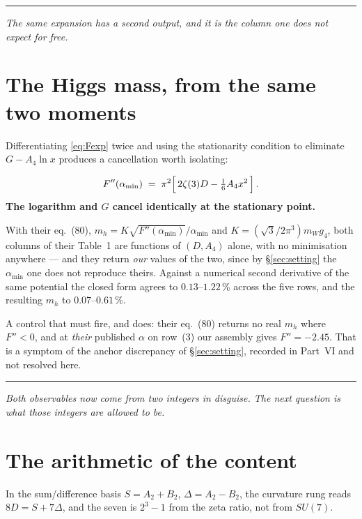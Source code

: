 \documentclass[11pt,a4paper]{article}
\newcommand{\su}[1]{SU(#1)}
\newcommand{\amin}{\alpha_{\min}}
\newcommand{\bridge}[1]{\par\medskip\noindent
  \textcolor{hdrblue!45}{\rule{2.2cm}{0.6pt}}\;\;\parbox[t]{0.84\textwidth}{\small\itshape
  \textcolor{hdrblue!85}{#1}}\par\medskip}
\newenvironment{keyeq}
  {\begin{center}\setlength{\fboxsep}{9pt}\setlength{\fboxrule}{0.8pt}%
   \begin{lrbox}{\keyeqbox}\begin{minipage}{0.88\textwidth}}
  {\end{minipage}\end{lrbox}%
   \fcolorbox{hdrblue!55}{hdrblue!6}{\usebox{\keyeqbox}}\end{center}}
\begin{document}
\bridge{The same expansion has a second output, and it is the column one does not expect for free.}

\section{The Higgs mass, from the same two moments}\label{sec:mh}

Differentiating \eqref{eq:Fexp} twice and using the stationarity condition to eliminate
$G-A_4\ln x$ produces a cancellation worth isolating:
\begin{keyeq}
\begin{equation}\label{eq:fpp}
  F''(\amin)\;=\;\pi^2\Bigl[\,2\zeta(3)D-\tfrac16 A_4 x^2\,\Bigr]\,.
\end{equation}
\textbf{The logarithm and $G$ cancel identically at the stationary point.}
\end{keyeq}

\noindent With their eq.~(80), $m_h=K\sqrt{F''(\amin)}/\amin$ and $K=(\sqrt3/2\pi^3)m_W g_4$, both
columns of their Table~1 are functions of $(D,A_4)$ alone, with no minimisation anywhere --- and
they return \emph{our} values of the two, since by \S\ref{sec:setting} the $\amin$ one does not
reproduce theirs. Against a
numerical second derivative of the same potential the closed form agrees to $0.13$--$1.22\,\%$
across the five rows, and the resulting $m_h$ to $0.07$--$0.61\,\%$.

A control that must fire, and does: their eq.~(80) returns no real $m_h$ where $F''<0$, and at
\emph{their} published $\alpha$ on row~(3) our assembly gives $F''=-2.45$. That is a symptom of the
anchor discrepancy of \S\ref{sec:setting}, recorded in Part~VI and not resolved here.

\bridge{Both observables now come from two integers in disguise. The next question is what those
integers are allowed to be.}

\section{The arithmetic of the content}\label{sec:arith}

In the sum/difference basis $S=A_2+B_2$, $\Delta=A_2-B_2$, the curvature rung reads
$8D=S+7\Delta$, and the seven is $2^3-1$ from the zeta ratio, not from $\su7$.
\end{document}
